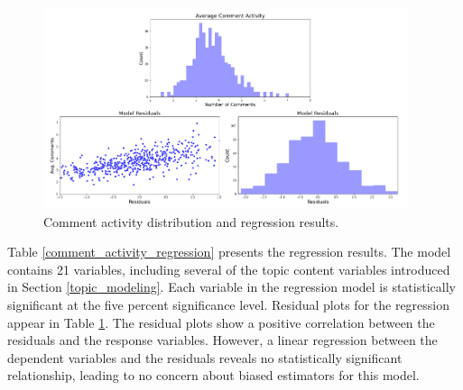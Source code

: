 \begin{figure}
  \includegraphics[width=0.95\textwidth]{comment_activity_results.PNG}
\caption{Comment activity distribution and regression results.}
\label{comment_activity_results}
\end{figure}

Table \ref{comment_activity_regression} presents the regression results. The model contains 21 variables, including several of the topic content variables introduced in Section \ref{topic_modeling}. Each variable in the regression model is statistically significant at the five percent significance level. Residual plots for the regression appear in Table \ref{comment_activity_results}. The residual plots show a positive correlation between the residuals and the response variables. However, a linear regression between the dependent variables and the residuals reveals no statistically significant relationship, leading to no concern about biased estimators for this model.

